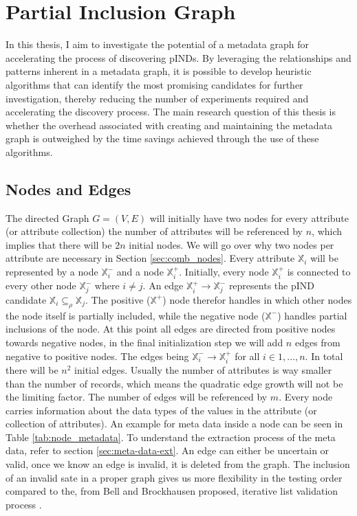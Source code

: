 
\chapter{Partial Inclusion Graph}
In this thesis, I aim to investigate the potential of a metadata graph for accelerating the process of discovering pINDs. By leveraging the relationships and patterns inherent in a metadata graph, it is possible to develop heuristic algorithms that can identify the most promising candidates for further investigation, thereby reducing the number of experiments required and accelerating the discovery process. The main research question of this thesis is whether the overhead associated with creating and maintaining the metadata graph is outweighed by the time savings achieved through the use of these algorithms.

\section{Nodes and Edges}
The directed Graph $G = (V, E)$ will initially have two nodes for every attribute (or attribute collection) the number of attributes will be referenced by $n$, which implies that there will be $2n$ initial nodes. We will go over why two nodes per attribute are necessary in Section \ref{sec:comb_nodes}. Every attribute $\mathbb{X}_i$ will be represented by a node $\mathbb{X}_i^-$ and a node $\mathbb{X}_i^+$. Initially, every node $\mathbb{X}_i^+$ is connected to every other node $\mathbb{X}_j^-$ where $i \not = j$. An edge $\mathbb{X}_i^+ \rightarrow \mathbb{X}_j^-$ represents the pIND candidate $\mathbb{X}_i \subseteq_\rho \mathbb{X}_j$. The positive ($\mathbb{X}^+$) node therefor handles in which other nodes the node itself is partially included, while the negative node ($\mathbb{X}^-$) handles partial inclusions of the node. At this point all edges are directed from positive nodes towards negative nodes, in the final initialization step we will add $n$ edges from negative to positive nodes. The edges being $\mathbb{X}_i^- \rightarrow \mathbb{X}_i^+$ for all $i \in 1, \dots, n$. In total there will be $n^2$ initial edges. Usually the number of attributes is way smaller than the number of records, which means the quadratic edge growth will not be the limiting factor. The number of edges will be referenced by $m$. Every node carries information about the data types of the values in the attribute (or collection of attributes). An example for meta data inside a node can be seen in Table \ref{tab:node_metadata}. To understand the extraction process of the meta data, refer to section \ref{sec:meta-data-ext}. An edge can either be uncertain or valid, once we know an edge is invalid, it is deleted from the graph. The inclusion of an invalid sate in a proper graph gives us more flexibility in the testing order compared to the, from Bell and Brockhausen proposed, iterative list validation process \cite{bell1995discovery}.

